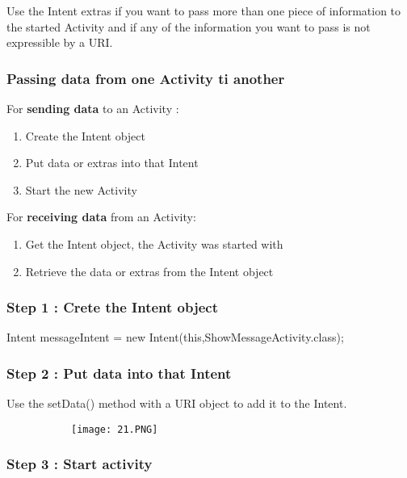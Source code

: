 \documentclass{article}
\begin{document}
Use the Intent extras if you want to pass more than one piece of information to the started Activity and if any of the information you want to pass is not expressible by a URI.

\subsubsection{Passing data from one Activity ti another}

For \textbf{sending data} to an Activity : 

\begin{enumerate}
    \item Create the Intent object
    \item Put data or extras into that Intent
    \item Start the new Activity
\end{enumerate}

For \textbf{receiving data} from an Activity:

    \begin{enumerate}
        \item Get the Intent object, the Activity was started with
        \item Retrieve the data or extras from the Intent object
    \end{enumerate}

\subsubsection{Step 1 : Crete the Intent object}

Intent messageIntent = new Intent(this,ShowMessageActivity.class);

\subsubsection{Step 2 : Put data into that Intent}

Use the setData() method with a URI object to add it to the Intent.

      \begin{figure}[ht!]
  \centering
  \begin{subfigure}[b]{0.6\linewidth}
    \texttt{[image: 21.PNG]}
  \end{subfigure}
  \end{figure}

  \subsubsection{Step 3 : Start activity}
\end{document}
